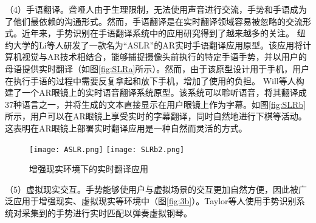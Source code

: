 （4）手语翻译。聋哑人由于生理限制，无法使用声音进行交流，手势和手语成为了他们最依赖的沟通形式。然而，手语翻译是在实时翻译领域容易被忽略的交流形式\cite{SLR1}。近年来，手势识别在手语翻译系统中的应用研究得到了越来越多的关注\cite{伍杰2019基于视觉的实时手势识别方法研究}。
纽约大学的Li等人研发了一款名为“ASLR”的AR实时手语翻译应用原型\cite{SLR1}。该应用将计算机视觉与AR技术相结合，能够捕捉摄像头前执行的特定手语手势，并以用户的母语提供实时翻译（如图\ref{fig:SLRa}所示）。然而，由于该原型设计用于手机，用户在执行手语的过程中需要反复拿起和放下手机，增加了使用的负担。
Will等人构建了一个AR眼镜上的实时语音翻译系统原型\cite{SLR2}。该系统可以聆听语音，将其翻译成37种语言之一，并将生成的文本直接显示在用户眼镜上作为字幕。如图\ref{fig:SLRb}所示，用户可以在AR眼镜上享受实时的字幕翻译，同时自然地进行下棋等活动。这表明在AR眼镜上部署实时翻译应用是一种自然而灵活的方式。

\begin{figure}
  \centering
    {\texttt{[image: ASLR.png]}}
    {\texttt{[image: SLRb2.png]}}
  \caption{增强现实环境下的实时翻译应用}
  \label{fig:SLR}
\end{figure}


（5）虚拟现实交互。手势能够使用户与虚拟场景的交互更加自然方便，因此被广泛应用于增强现实、虚拟现实等环境中（图\ref{fig:3b}）。Taylor等人使用手势识别系统对采集到的手势进行实时匹配以弹奏虚拟钢琴\cite{taylor2016efficient}。

